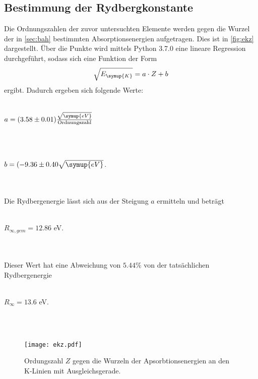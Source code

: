     \subsection{Bestimmung der Rydbergkonstante}  
        Die Ordnungszahlen der zuvor untersuchten Elemente werden gegen die Wurzel der in \autoref{sec:bah} bestimmten Absorptionsenergien
        aufgetragen. Dies ist in \autoref{fig:ekz} dargestellt. 
        Über die Punkte wird mittels Python 3.7.0 eine lineare Regression durchgeführt, sodass sich eine Funktion der Form
        \begin{equation}
        \label{eqn:regress}
            \sqrt{E_{\symup{K}}} = a \cdot Z + b
        \end{equation}
        ergibt. Dadurch ergeben sich folgende Werte:
        \\ \\
        \centerline{$a = (3.58 \pm 0.01) \frac{\sqrt{\symup{eV}}}{\text{Ordnungszahl}} $}
        \\ \\
        \centerline{$b = (-9.36 \pm 0.40 \sqrt{\symup{eV}}$.}
        \\ \\
        Die Rydbergenergie lässt sich aus der Steigung $a$ ermitteln und beträgt
        \\ \\
        \centerline{$R_{\infty, gem} = 12.86$ eV.}
        \\ \\
        Dieser Wert hat eine Abweichung von $5.44 \%$ von der tatsächlichen Rydbergenergie
        \\ \\
        \centerline{$R_{\infty} = 13.6$ eV.}
        \\ \\
        \begin{figure}
            \centering
            \texttt{[image: ekz.pdf]}
            \caption{Ordungszahl $Z$ gegen die Wurzeln der Apsorbtionsenergien an den K-Linien mit Ausgleichsgerade.}
            \label{fig:ekz}
        \end{figure}

